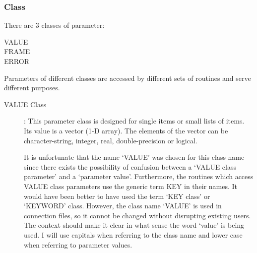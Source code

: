 \subsubsection {Class}
There are 3 classes of parameter:
\begin{description}
\begin{description}
\item [VALUE]
\item [FRAME]
\item [ERROR]
\end{description}
\end{description}
Parameters of different classes are accessed by different sets of routines
and serve different purposes.
\begin{description}
\item [VALUE Class]:
This parameter class is designed for single items or small lists of items.
Its value is a vector (1-D array).
The elements of the vector can be character-string, integer, real,
double-precision or logical.

It is unfortunate that the name `VALUE' was chosen for this class name since
there exists the possibility of confusion between a `VALUE class parameter' and
a `parameter value'.
Furthermore, the routines which access VALUE class parameters use the generic
term KEY in their names.
It would have been better to have used the term `KEY class' or `KEYWORD' class.
However, the class name `VALUE' is used in connection files, so it cannot be
changed without disrupting existing users.
The context should make it clear in what sense the word `value' is being used.
I will use capitals when referring to the class name and lower case when
referring to parameter values.


\end{description}
